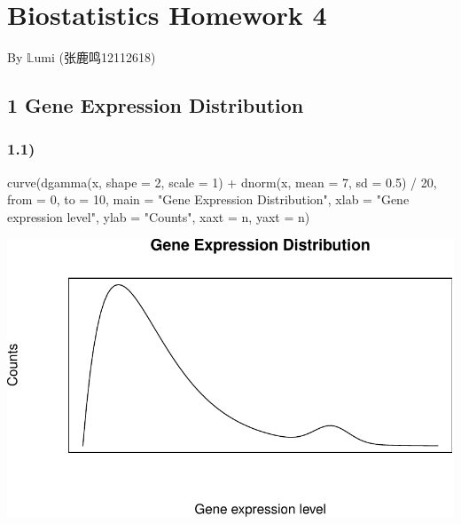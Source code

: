 \documentclass[
]{article}
\author{}
\date{\vspace{-2.5em}}
\newenvironment{Shaded}{\begin{snugshade}}{\end{snugshade}}
\newcommand{\AttributeTok}[1]{\textcolor[rgb]{0.77,0.63,0.00}{#1}}
\newcommand{\DecValTok}[1]{\textcolor[rgb]{0.00,0.00,0.81}{#1}}
\newcommand{\FloatTok}[1]{\textcolor[rgb]{0.00,0.00,0.81}{#1}}
\newcommand{\FunctionTok}[1]{\textcolor[rgb]{0.00,0.00,0.00}{#1}}
\newcommand{\NormalTok}[1]{#1}
\newcommand{\SpecialCharTok}[1]{\textcolor[rgb]{0.00,0.00,0.00}{#1}}
\newcommand{\StringTok}[1]{\textcolor[rgb]{0.31,0.60,0.02}{#1}}
\begin{document}
\hypertarget{biostatistics-homework-4}{%
\section{Biostatistics Homework 4}\label{biostatistics-homework-4}}

By \(\mathbb{L}\)umi (张鹿鸣12112618)

\vspace{5mm}

\hypertarget{gene-expression-distribution}{%
\subsection{1 Gene Expression
Distribution}\label{gene-expression-distribution}}

\hypertarget{section}{%
\subsubsection{1.1)}\label{section}}

\begin{Shaded}
\begin{Highlighting}[]
\FunctionTok{curve}\NormalTok{(}\FunctionTok{dgamma}\NormalTok{(x, }\AttributeTok{shape =} \DecValTok{2}\NormalTok{, }\AttributeTok{scale =} \DecValTok{1}\NormalTok{) }\SpecialCharTok{+} \FunctionTok{dnorm}\NormalTok{(x, }\AttributeTok{mean =} \DecValTok{7}\NormalTok{, }\AttributeTok{sd =} \FloatTok{0.5}\NormalTok{) }\SpecialCharTok{/} \DecValTok{20}\NormalTok{,}
      \AttributeTok{from =} \DecValTok{0}\NormalTok{, }\AttributeTok{to =} \DecValTok{10}\NormalTok{,}
      \AttributeTok{main =} \StringTok{"Gene Expression Distribution"}\NormalTok{,}
      \AttributeTok{xlab =} \StringTok{"Gene expression level"}\NormalTok{, }\AttributeTok{ylab =} \StringTok{"Counts"}\NormalTok{,}
      \AttributeTok{xaxt =} \StringTok{\textquotesingle{}n\textquotesingle{}}\NormalTok{, }\AttributeTok{yaxt =} \StringTok{\textquotesingle{}n\textquotesingle{}}\NormalTok{)}
\end{Highlighting}
\end{Shaded}

\begin{center}\includegraphics{hw4_files/figure-latex/unnamed-chunk-1-1} \end{center}
\end{document}
